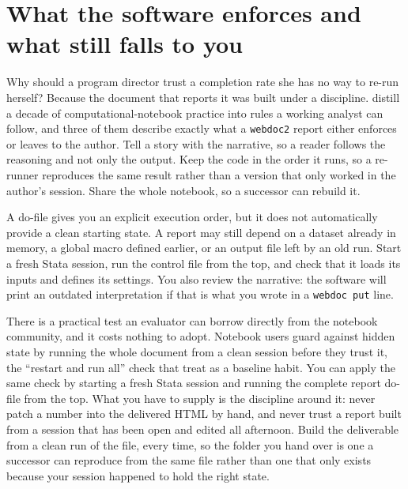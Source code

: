 \section{What the software enforces and what still falls to you}
Why should a program director trust a completion rate she has no way to re-run herself? Because the document that reports it was built under a discipline. \textcite{rule2019ten} distill a decade of computational-notebook practice into rules a working analyst can follow, and three of them describe exactly what a \texttt{webdoc2} report either enforces or leaves to the author. Tell a story with the narrative, so a reader follows the reasoning and not only the output. Keep the code in the order it runs, so a re-runner reproduces the same result rather than a version that only worked in the author's session. Share the whole notebook, so a successor can rebuild it.

A do-file gives you an explicit execution order, but it does not automatically provide a clean starting state. A report may still depend on a dataset already in memory, a global macro defined earlier, or an output file left by an old run. Start a fresh Stata session, run the control file from the top, and check that it loads its inputs and defines its settings. You also review the narrative: the software will print an outdated interpretation if that is what you wrote in a \texttt{webdoc put} line.

There is a practical test an evaluator can borrow directly from the notebook community, and it costs nothing to adopt. Notebook users guard against hidden state by running the whole document from a clean session before they trust it, the \enquote{restart and run all} check that \textcite{rule2019ten} treat as a baseline habit. You can apply the same check by starting a fresh Stata session and running the complete report do-file from the top. What you have to supply is the discipline around it: never patch a number into the delivered HTML by hand, and never trust a report built from a session that has been open and edited all afternoon. Build the deliverable from a clean run of the file, every time, so the folder you hand over is one a successor can reproduce from the same file rather than one that only exists because your session happened to hold the right state.

